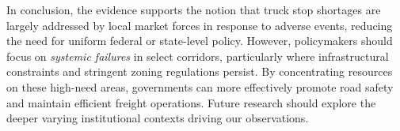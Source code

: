 \documentclass[
  12pt]{article}
\begin{document}
In conclusion, the evidence supports the notion that truck stop
shortages are largely addressed by local market forces in response to
adverse events, reducing the need for uniform federal or state-level
policy. However, policymakers should focus on \emph{systemic failures}
in select corridors, particularly where infrastructural constraints and
stringent zoning regulations persist. By concentrating resources on
these high-need areas, governments can more effectively promote road
safety and maintain efficient freight operations. Future research should
explore the deeper varying institutional contexts driving our
observations.


  
\end{document}
